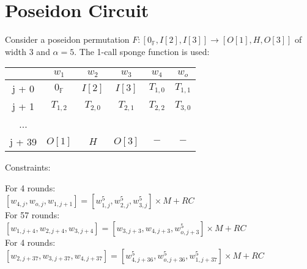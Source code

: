 \section{Poseidon Circuit}
\label{section:poseidon}
Consider a poseidon permutation $F: [0_{\mathbb{F}}, I[2], I[3]] \rightarrow [O[1], H, O[3]]$ of width $3$ and $\alpha = 5$.
The 1-call sponge function is used:
\begin{center}
    \begin{tabular}{ c|c|c|c|c|c }
        & $w_1$            & $w_2$     & $w_3$     & $w_4$     & $w_o$     \\
        \hline
        j + 0  & $0_{\mathbb{F}}$ & $I[2]$    & $I[3]$    & $T_{1,0}$ & $T_{1,1}$ \\
        j + 1  & $T_{1,2}$        & $T_{2,0}$ & $T_{2,1}$ & $T_{2,2}$ & $T_{3,0}$ \\
        ...    &                  &           &           &           &           \\
        j + 39 & $O[1]$           & $H$       & $O[3]$    & $-$       & $-$       \\
    \end{tabular}
\end{center}
Constraints:
\begin{center}
    For 4 rounds: \\
    $ [w_{4, j}, w_{o, j}, w_{1, j+1}] = [w_{1,j}^5, w_{2,j}^5, w_{3,j}^5] \times M + RC$ \\
    For 57 rounds: \\
    $ [w_{1, j +4}, w_{2, j + 4}, w_{3, j+4}] = [w_{3,j+3}, w_{4,j + 3}, w_{o,j +3}^5] \times M + RC$ \\
    For 4 rounds: \\
    $ [w_{2, j + 37}, w_{3, j + 37}, w_{4, j+37}] = [w_{4,j +36}^5, w_{o,j +36}^5, w_{1,j + 37}^5] \times M + RC$ \\
\end{center}
